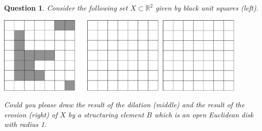 \documentclass[a4paper, 11pt]{article}
\newtheorem{qu}{Question}
\begin{document}
\begin{qu}
  Consider the following set $X\subset\mathbb{R}^2$ given by black unit
  squares (left).
    \begin{center}
    \includegraphics[width=12cm]{morpho1}
    \end{center}
    Could you please draw  the result of the dilation (middle)
   and the result of the erosion  (right) of $X$ by a structuring
   element $B$ which is an open Euclidean disk with radius 1.

\end{qu}
\end{document}
